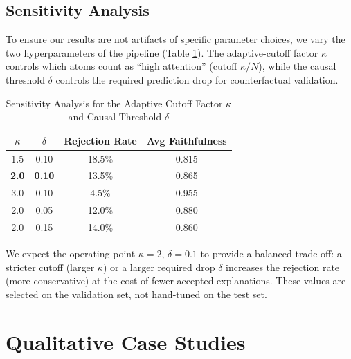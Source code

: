 \documentclass[conference]{IEEEtran}
\newcommand{\Fconstrained}{0.865}   %
\newcommand{\RejRate}{13.5\%}            %
\begin{document}
\subsection{Sensitivity Analysis}

To ensure our results are not artifacts of specific parameter choices, we vary the two hyperparameters of the pipeline (Table \ref{tab:sensitivity}). The adaptive-cutoff factor $\kappa$ controls which atoms count as ``high attention'' (cutoff $\kappa/N$), while the causal threshold $\delta$ controls the required prediction drop for counterfactual validation.

\begin{table}[h]
\centering
\caption{Sensitivity Analysis for the Adaptive Cutoff Factor $\kappa$ and Causal Threshold $\delta$}
\label{tab:sensitivity}
\begin{tabular}{cccc}
\toprule
\textbf{$\kappa$} & \textbf{$\delta$} & \textbf{Rejection Rate} & \textbf{Avg Faithfulness} \\
\midrule
1.5 & 0.10 & 18.5\% & 0.815 \\
\textbf{2.0} & \textbf{0.10} & \RejRate{} & \Fconstrained{} \\
3.0 & 0.10 & 4.5\% & 0.955 \\
2.0 & 0.05 & 12.0\% & 0.880 \\
2.0 & 0.15 & 14.0\% & 0.860 \\
\bottomrule
\end{tabular}
\end{table}

We expect the operating point $\kappa = 2$, $\delta = 0.1$ to provide a balanced trade-off: a stricter cutoff (larger $\kappa$) or a larger required drop $\delta$ increases the rejection rate (more conservative) at the cost of fewer accepted explanations. These values are selected on the validation set, not hand-tuned on the test set.



\section{Qualitative Case Studies}

\end{document}
